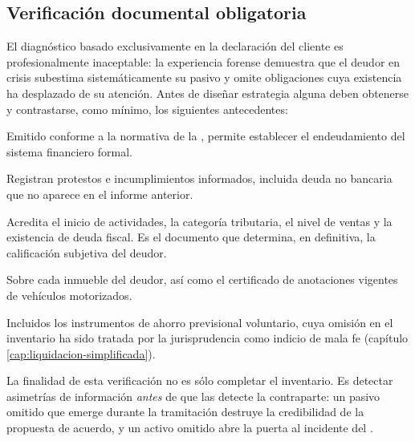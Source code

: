 \subsection{Verificación documental obligatoria}

El diagnóstico basado exclusivamente en la declaración del cliente es profesionalmente
inaceptable: la experiencia forense demuestra que el deudor en crisis subestima
sistemáticamente su pasivo y omite obligaciones cuya existencia ha desplazado de su
atención. Antes de diseñar estrategia alguna deben obtenerse y contrastarse, como
mínimo, los siguientes antecedentes:

\begin{description}[leftmargin=0pt,style=nextline,font=\sffamily\bfseries]
  \item[Informe consolidado de deudas] Emitido conforme a la normativa de la \cmf{},
  permite establecer el endeudamiento del sistema financiero formal.

  \item[Boletines comerciales] Registran protestos e incumplimientos informados, incluida
  deuda no bancaria que no aparece en el informe anterior.

  \item[Carpeta tributaria electrónica del \sii{}] Acredita el inicio de actividades, la
  categoría tributaria, el nivel de ventas y la existencia de deuda fiscal. Es el
  documento que determina, en definitiva, la calificación subjetiva del deudor.

  \item[Certificados de hipotecas, gravámenes y prohibiciones] Sobre cada inmueble del
  deudor, así como el certificado de anotaciones vigentes de vehículos motorizados.

  \item[Cartola de cotizaciones y saldos previsionales] Incluidos los instrumentos de
  ahorro previsional voluntario, cuya omisión en el inventario ha sido tratada por la
  jurisprudencia como indicio de mala fe (capítulo \ref{cap:liquidacion-simplificada}).
\end{description}

\begin{practica}
La finalidad de esta verificación no es sólo completar el inventario. Es detectar
asimetrías de información \emph{antes} de que las detecte la contraparte: un pasivo
omitido que emerge durante la tramitación destruye la credibilidad de la propuesta de
acuerdo, y un activo omitido abre la puerta al incidente del .
\end{practica}

